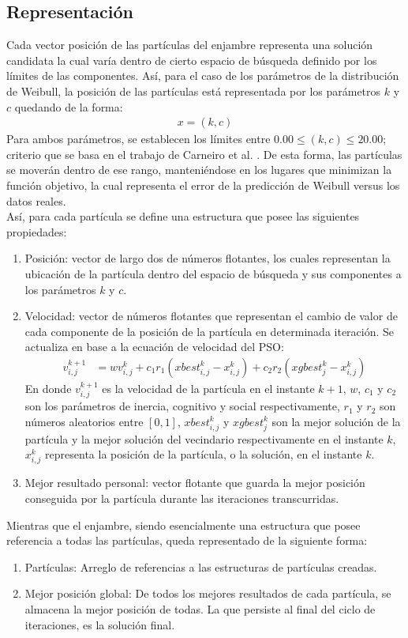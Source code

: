 \subsection{Representación}
Cada vector posición de las partículas del enjambre representa una solución candidata la cual varía dentro de cierto espacio de búsqueda definido por los límites de las componentes. Así, para el caso de los parámetros de la distribución de Weibull, la posición de las partículas está representada por los parámetros $k$ y $c$ quedando de la forma:
\begin{align}
    x = (k, c)
\end{align}    
Para ambos parámetros, se establecen los límites entre $0.00 \leq (k,c) \leq 20.00$; criterio que se basa en el trabajo de Carneiro et al. \cite{Carneiro15}. De esta forma, las partículas se moverán dentro de ese rango, manteniéndose en los lugares que minimizan la función objetivo, la cual representa el error de la predicción de Weibull versus los datos reales.\\
Así, para cada partícula se define una estructura que posee las siguientes propiedades: 
\begin{enumerate}\label{rep:Particle}
    \item Posición: vector de largo dos de números flotantes, los cuales representan la ubicación de la partícula dentro del espacio de búsqueda y sus componentes a los parámetros $k$ y $c$.
    \item Velocidad: vector de números flotantes que representan el cambio de valor de cada componente de la posición de la partícula en determinada iteración. Se actualiza en base a la ecuación de velocidad del PSO:
    \begin{align}\label{eq:PSO}
      v_{i,j}^{k+1} &= wv_{i,j}^{k} + c_{1}r_{1}(xbest_{i,j}^k - x_{i,j}^k) + c_{2}r_{2}(xgbest_{j}^{k} - x_{i,j}^k)
    \end{align} 
    En donde $v_{i,j}^{k+1}$ es la velocidad de la partícula en el instante $k+1$, $w$, $c_1$ y $c_2$ son los parámetros de inercia, cognitivo y social respectivamente, $r_{1}$ y $r_{2}$ son números aleatorios entre $[0, 1]$, $xbest_{i,j}^k$ y $xgbest_{j}^{k}$ son la mejor solución de la partícula y la mejor solución del vecindario respectivamente en el instante $k$, $x_{i,j}^k$ representa la posición de la partícula, o la solución, en el instante $k$.    
    \item Mejor resultado personal: vector flotante que guarda la mejor posición conseguida por la partícula durante las iteraciones transcurridas.    
\end{enumerate}        
Mientras que el enjambre, siendo esencialmente una estructura que posee referencia a todas las partículas, queda representado de la siguiente forma:
\begin{enumerate}\label{rep:Swarm}
    \item Partículas: Arreglo de referencias a las estructuras de partículas creadas.
    \item Mejor posición global: De todos los mejores resultados de cada partícula, se almacena la mejor posición de todas. La que persiste al final del ciclo de iteraciones, es la solución final.
\end{enumerate} 

